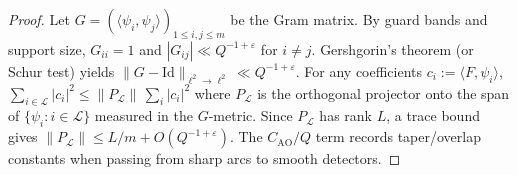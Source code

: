 \begin{proof}
Let $G=(\langle \psi_i,\psi_j\rangle)_{1\le i,j\le m}$ be the Gram matrix. By guard bands and support size, $G_{ii}=1$ and $|G_{ij}|\ll Q^{-1+\varepsilon}$ for $i\ne j$. Gershgorin’s theorem (or Schur test) yields $\|G-\mathrm{Id}\|_{\ell^2\to\ell^2}\ll Q^{-1+\varepsilon}$. For any coefficients $c_i:=\langle F,\psi_i\rangle$, $\sum_{i\in\mathcal L}|c_i|^2 \le \|P_{\mathcal L}\|\,\sum_{i}|c_i|^2$ where $P_{\mathcal L}$ is the orthogonal projector onto the span of $\{\psi_i:i\in\mathcal L\}$ measured in the $G$-metric. Since $P_{\mathcal L}$ has rank $L$, a trace bound gives $\|P_{\mathcal L}\|\le L/m + O(Q^{-1+\varepsilon})$. The $C_{\mathrm{AO}}/Q$ term records taper/overlap constants when passing from sharp arcs to smooth detectors.
\end{proof}
